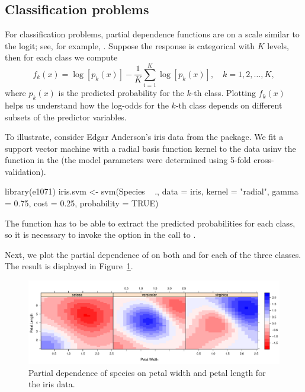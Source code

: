 \subsection{Classification problems}

For classification problems, partial dependence functions are on a scale similar to the logit; see, for example, \citet[pp. 369--370]{hastie-elements-2009}. Suppose the response is categorical with $K$ levels, then for each class we compute
\begin{equation}
\label{eqn:avg-logit}
f_k(x) = \log\left[p_k(x)\right] - \frac{1}{K}\sum_{i = 1}^K\log\left[p_k(x)\right], \quad k = 1, 2, \dots, K,
\end{equation}
where $p_k(x)$ is the predicted probability for the $k$-th class. Plotting $f_k(x)$ helps us understand how the log-odds for the $k$-th class depends on different subsets of the predictor variables.

To illustrate, consider Edgar Anderson's iris data from the  package. We fit a support vector machine with a radial basis function kernel to the data usinv the  function in the  (the model parameters were determined using 5-fold cross-validation).
\begin{example}
library(e1071)
iris.svm <- svm(Species ~ ., data = iris, kernel = "radial", gamma = 0.75, 
                cost = 0.25, probability = TRUE)
\end{example}
The  function has to be able to extract the predicted probabilities for each class, so it is necessary to invoke the  option in the call to .

Next, we plot the partial dependence of  on both  and  for each of the three classes. The result is displayed in Figure~\ref{fig:partial_iris}.

\begin{figure}[htbp]
  \centering
  \includegraphics[width=1.0\linewidth]{partial_iris_svm}
  \caption{Partial dependence of species on petal width and petal length for the iris data.}
  \label{fig:partial_iris}
\end{figure}


